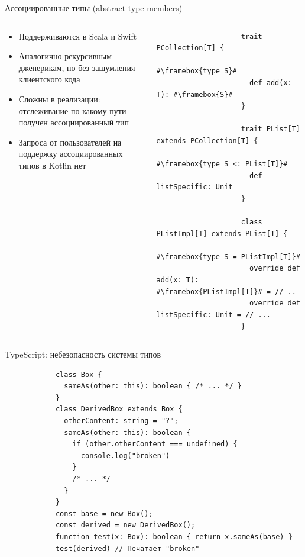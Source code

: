 \documentclass[handout,aspectratio=169,usenames,dvipsnames]{beamer}
\begin{document}
    \begin{frame}[fragile]{Ассоциированные типы (abstract type members)}
        \begin{columns}[onlytextwidth]
            \begin{column}[t]{0.40\textwidth}
                \begin{itemize}
                    \item Поддерживаются в Scala и Swift
                    \item Аналогично рекурсивным дженерикам, но без зашумления клиентского кода
                    \item Сложны в реализации: отслеживание по какому пути получен ассоциированный тип
                    \item Запроса от пользователей на поддержку ассоциированных типов в Kotlin нет
                \end{itemize}
            \end{column}\hfill%
            \begin{column}[t]{0.58\textwidth}
                \begin{verbatim}
                    trait PCollection[T] {
                      #\framebox{type S}#
                      def add(x: T): #\framebox{S}#
                    }

                    trait PList[T] extends PCollection[T] {
                      #\framebox{type S <: PList[T]}#
                      def listSpecific: Unit
                    }

                    class PListImpl[T] extends PList[T] {
                      #\framebox{type S = PListImpl[T]}#
                      override def add(x: T): #\framebox{PListImpl[T]}# = // ..
                      override def listSpecific: Unit = // ...
                    }
                \end{verbatim}
            \end{column}
        \end{columns}
    \end{frame}

    \begin{frame}[fragile]{TypeScript: небезопасность системы типов}
        \begin{verbatim}
            class Box {
              sameAs(other: this): boolean { /* ... */ }
            }
            class DerivedBox extends Box {
              otherContent: string = "?";
              sameAs(other: this): boolean {
                if (other.otherContent === undefined) {
                  console.log("broken")
                }
                /* ... */
              }
            }
            const base = new Box();
            const derived = new DerivedBox();
            function test(x: Box): boolean { return x.sameAs(base) }
            test(derived) // Печатает "broken"
        \end{verbatim}
    \end{frame}
\end{document}

